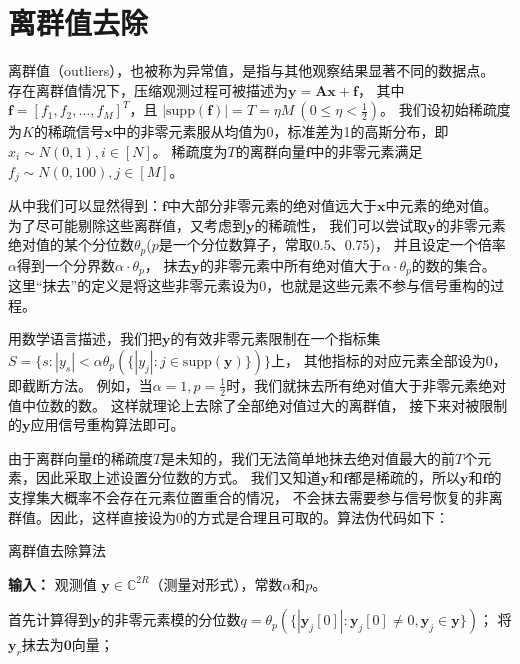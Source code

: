 \documentclass[AutoFakeBold]{LZUThesis}
\begin{document}
\section{离群值去除}
\label{removal}
离群值（outliers），也被称为异常值，是指与其他观察结果显著不同的数据点。
存在离群值情况下，压缩观测过程可被描述为$\mathbf{y} = \mathbf{Ax} + \mathbf{f}$，
其中$\mathbf{f} = [f_1, f_2, \dots, f_M]^T$，且
$\left | \mathrm{supp} (\mathbf{f}) \right | = T = \eta M \ (0 \leq \eta < \frac{1}{2})$。
我们设初始稀疏度为$K$的稀疏信号$\mathbf{x}$中的非零元素服从均值为0，标准差为1的高斯分布，即$x_i \sim N(0, 1), i \in [N]$。
稀疏度为$T$的离群向量$\mathbf{f}$中的非零元素满足$f_j \sim N(0, 100), j \in [M]$。

从中我们可以显然得到：$\mathbf{f}$中大部分非零元素的绝对值远大于$\mathbf{x}$中元素的绝对值。
为了尽可能剔除这些离群值，又考虑到$\mathbf{y}$的稀疏性，
我们可以尝试取$\mathbf{y}$的非零元素绝对值的某个分位数$\theta_p$($p$是一个分位数算子，常取0.5、0.75)，
并且设定一个倍率$\alpha$得到一个分界数$\alpha \cdot \theta_p$，
抹去$\mathbf{y}$的非零元素中所有绝对值大于$\alpha \cdot \theta_p$的数的集合。
这里“抹去”的定义是将这些非零元素设为0，也就是这些元素不参与信号重构的过程。

用数学语言描述，我们把$\mathbf{y}$的有效非零元素限制在一个指标集
$S = \{s: |y_s| < \alpha \theta_p (\{|y_j| : j \in \mathrm{supp} (\mathbf{y})\})\}$上，
其他指标的对应元素全部设为0，
即截断方法。
例如，当$\alpha = 1, p = \frac{1}{2}$时，我们就抹去所有绝对值大于非零元素绝对值中位数的数。
这样就理论上去除了全部绝对值过大的离群值，
接下来对被限制的$\mathbf{y}$应用信号重构算法即可。

由于离群向量$\mathbf{f}$的稀疏度$T$是未知的，我们无法简单地抹去绝对值最大的前$T$个元素，因此采取上述设置分位数的方式。
我们又知道$\mathbf{y}$和$\mathbf{f}$都是稀疏的，所以$\mathbf{y}$和$\mathbf{f}$的支撑集大概率不会存在元素位置重合的情况，
不会抹去需要参与信号恢复的非离群值。因此，这样直接设为0的方式是合理且可取的。算法伪代码如下：

\begin{algorithm}[H]
    \caption{离群值去除算法\label{Alg:outliers_removal}}
    \hspace*{0.02in} {\bf 输入：}
    观测值 $\mathbf{y} \in \mathbb{C}^{2R}$（测量对形式），常数$\alpha$和$p$。
    \begin{algorithmic}[1]
        \State 首先计算得到$\mathbf{y}$的非零元素模的分位数$q = \theta_p (\{|\mathbf{y}_j[0]|: \mathbf{y}_j[0] \neq 0, \mathbf{y}_j \in \mathbf{y}\})$；
                \State 将$\mathbf{y}_r$抹去为$\mathbf{0}$向量；
            \EndIf
        \EndFor
    \end{algorithmic}
\end{algorithm}
\end{document}
